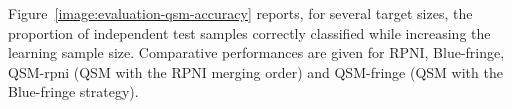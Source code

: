Figure~\ref{image:evaluation-qsm-accuracy} reports, for several target sizes, the proportion of independent test samples correctly classified while increasing the learning sample size. Comparative performances are given for RPNI, Blue-fringe, QSM-rpni (QSM with the RPNI merging order) and QSM-fringe (QSM with the Blue-fringe strategy).

\begin{figure}
\centering
{}\vspace{0.35cm}
\scalebox{.25}{
}
\end{figure}
